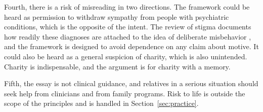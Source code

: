 \documentclass[11pt]{article}
\theoremstyle{definition}
\theoremstyle{remark}
\begin{document}
Fourth, there is a risk of misreading in two directions. The framework could be heard as permission to withdraw sympathy from people with psychiatric conditions, which is the opposite of the intent. The review of stigma documents how readily these diagnoses are attached to the idea of deliberate misbehavior \citep{sheehan2016}, and the framework is designed to avoid dependence on any claim about motive. It could also be heard as a general suspicion of charity, which is also unintended. Charity is indispensable, and the argument is for charity with a memory.

Fifth, the essay is not clinical guidance, and relatives in a serious situation should seek help from clinicians and from family programs. Risk to life is outside the scope of the principles and is handled in Section~\ref{sec:practice}.
\end{document}
